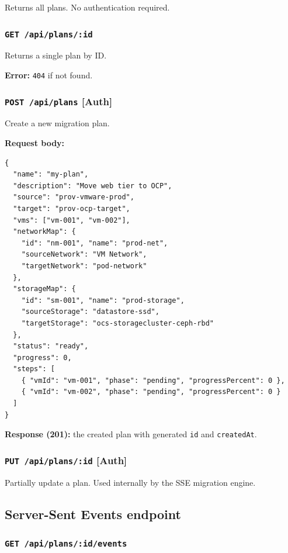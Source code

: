 \documentclass[12pt,a4paper]{article}
\begin{document}
Returns all plans. No authentication required.

\subsubsection{\texttt{GET /api/plans/:id}}

Returns a single plan by ID.

\textbf{Error:} \texttt{404} if not found.

\subsubsection{\texttt{POST /api/plans} \textnormal{\textbf{[Auth]}}}

Create a new migration plan.

\textbf{Request body:}
\begin{lstlisting}[language={}]
{
  "name": "my-plan",
  "description": "Move web tier to OCP",
  "source": "prov-vmware-prod",
  "target": "prov-ocp-target",
  "vms": ["vm-001", "vm-002"],
  "networkMap": {
    "id": "nm-001", "name": "prod-net",
    "sourceNetwork": "VM Network",
    "targetNetwork": "pod-network"
  },
  "storageMap": {
    "id": "sm-001", "name": "prod-storage",
    "sourceStorage": "datastore-ssd",
    "targetStorage": "ocs-storagecluster-ceph-rbd"
  },
  "status": "ready",
  "progress": 0,
  "steps": [
    { "vmId": "vm-001", "phase": "pending", "progressPercent": 0 },
    { "vmId": "vm-002", "phase": "pending", "progressPercent": 0 }
  ]
}
\end{lstlisting}

\textbf{Response (201):} the created plan with generated \texttt{id} and \texttt{createdAt}.

\subsubsection{\texttt{PUT /api/plans/:id} \textnormal{\textbf{[Auth]}}}

Partially update a plan. Used internally by the SSE migration engine.

\subsection{Server-Sent Events endpoint}

\subsubsection{\texttt{GET /api/plans/:id/events}}
\end{document}
